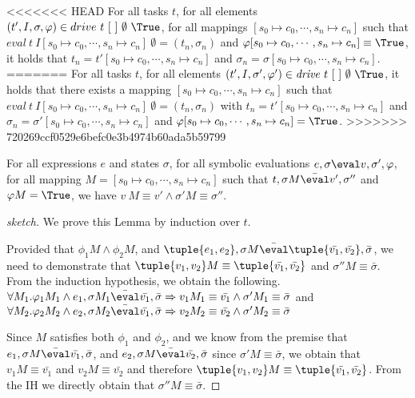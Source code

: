 \begin{theorem}
\label{thm:sound}

<<<<<<< HEAD
For all tasks $t$, for all elements $(t',I,\sigma,\phi)\in drive\ t\ [\ ]\ \emptyset\ \True$,
for all mappings $[s_0\mapsto c_0,\cdots,s_n\mapsto c_n]$ such that
$eval\ t\ I[s_0\mapsto c_0,\cdots,s_n\mapsto c_n]\ \emptyset=(t_n,\sigma_n)$ and $\phi[s_0\mapsto c_0,\cdots,s_n\mapsto c_n]\equiv\True$,
it holds that $t_n=t'[s_0\mapsto c_0,\cdots,s_n\mapsto c_n]$ and $\sigma_n=\sigma[s_0\mapsto c_0,\cdots,s_n\mapsto c_n]$.
=======
For all tasks $t$, for all elements $(t',I,\sigma',\phi')\in \mathit{drive}\ t\ [\ ]\ \emptyset\ \True$,
it holds that there exists a mapping $[s_0\mapsto c_0,\cdots,s_n\mapsto c_n]$ such that
$\mathit{eval}\ t\ I[s_0\mapsto c_0,\cdots,s_n\mapsto c_n]\ \emptyset=(t_n,\sigma_n)$ with $t_n=t'[s_0\mapsto c_0,\cdots,s_n\mapsto c_n]$ and $\sigma_n=\sigma'[s_0\mapsto c_0,\cdots,s_n\mapsto c_n]$ and $\phi[s_0\mapsto c_0,\cdots,s_n\mapsto c_n]=\True$.
>>>>>>> 720269ccf0529e6befc0e3b4974b60ada5b59799
\end{theorem}


\begin{lemma}
  \label{lem:soundeval}

  For all expressions $e$ and states $\sigma$,
  for all symbolic evaluations $e,\sigma\eval v,\sigma',\phi$,
  for all mapping $M=[s_0\mapsto c_0,\cdots,s_n\mapsto c_n]$
  such that $t,\sigma M \bar{\eval}v',\sigma''$ and $\phi M = \True$,
  we have $v\ M \equiv v' \wedge \sigma' M \equiv \sigma''$.

\end{lemma}

\begin{proof}[sketch]
  We prove this Lemma by induction over $t$.



Provided that $\phi_1 M\wedge\phi_2 M$, and $\tuple{e_1, e_2},\sigma M\bar{\eval}\tuple{\bar{v_1},\bar{v_2}},\bar{\sigma}$,
we need to demonstrate that $\tuple{v_1,v_2} M \equiv \tuple{\bar{v_1},\bar{v_2}}$ and $\sigma'' M\equiv\bar{\sigma}$.
From the induction hypothesis, we obtain the following. $\forall M_1 . \phi_1 M_1 \wedge e_1,\sigma M_1\bar{\eval}\bar{v_1},\bar{\sigma}\implies v_1 M_1\equiv \bar{v_1} \wedge \sigma' M_1\equiv\bar{\sigma}$ and
$\forall M_2 . \phi_2 M_2 \wedge e_2,\sigma M_2\bar{\eval}\bar{v_1},\bar{\sigma}\implies v_2 M_2\equiv \bar{v_2} \wedge \sigma' M_2\equiv\bar{\sigma}$

Since $M$ satisfies both $\phi_1$ and $\phi_2$, and we know from the premise that $e_1,\sigma M\bar{\eval}\bar{v_1},\bar{\sigma}$, and $e_2,\sigma M\bar{\eval}\bar{v_2},\bar{\sigma}$ since $\sigma' M \equiv \bar{\sigma}$, we obtain that $v_1 M\equiv \bar{v_1}$ and $v_2 M\equiv \bar{v_2}$ and therefore $\tuple{v_1,v_2} M \equiv \tuple{\bar{v_1},\bar{v_2}}$.
From the IH we directly obtain that $\sigma'' M\equiv\bar{\sigma}$.

\end{proof}

